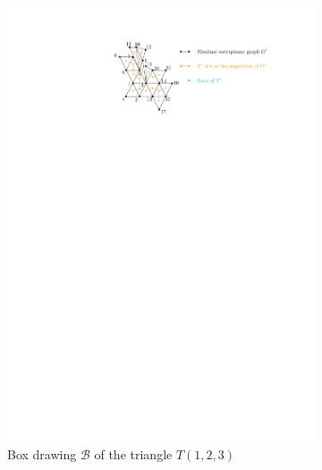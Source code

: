 \begin{figure}[H]
	\centering
	\begin{subfigure}{0.49\textwidth}
		\centering
		\includegraphics[page=2,width=\linewidth]{graphics/maximal_outerplanar_example_drawings.pdf}
		\caption{Box drawing $\mathcal{B}$ of the triangle $T(1,2,3)$}
	\end{subfigure}
\begin{subfigure}{0.49\textwidth}
\centering

\end{subfigure}
\end{figure}
